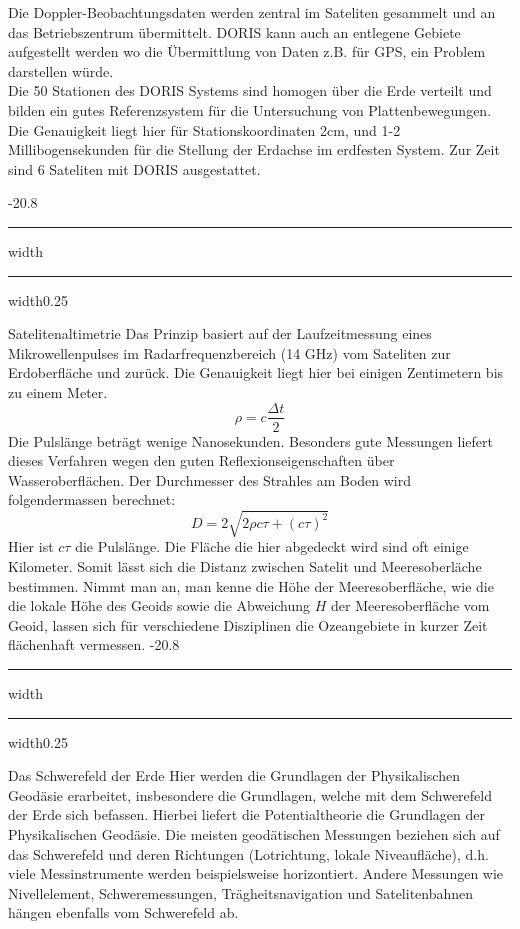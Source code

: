 \documentclass[9pt, landscape, fleqn]{scrartcl}
\makeatletter
\renewcommand{\section}{\@startsection{section}{1}{0mm}%
{-2\baselineskip}{0.8\baselineskip}%
{\hrule depth 0.2pt width\columnwidth\hrule depth1.5pt
width0.25\columnwidth\vspace*{1.2em}\Large\bfseries\rmfamily}}
\renewcommand{\subsection}{\@startsection{subsection}{1}{0mm}%
{-2\baselineskip}{0.8\baselineskip}%
{\hrule depth 0.2pt width\columnwidth\hrule depth0.75pt
width0.25\columnwidth\vspace*{1.2em}\large\bfseries\rmfamily}}
\makeatother
\begin{document}
\begin{multicols*}{3}
Die Doppler-Beobachtungsdaten werden zentral im Sateliten gesammelt und an das Betriebszentrum übermittelt. DORIS kann auch an entlegene Gebiete aufgestellt werden wo die Übermittlung von Daten z.B. für GPS, ein Problem darstellen würde. \\

Die 50 Stationen des DORIS Systems sind homogen über die Erde verteilt und bilden ein gutes Referenzsystem für die Untersuchung von Plattenbewegungen. Die Genauigkeit liegt hier für Stationskoordinaten 2cm, und 1-2 Millibogensekunden für die Stellung der Erdachse im erdfesten System. Zur Zeit sind 6 Sateliten mit DORIS ausgestattet.

\subsection{Satelitenaltimetrie}
Das Prinzip basiert auf der Laufzeitmessung eines Mikrowellenpulses im Radarfrequenzbereich (14 GHz) vom Sateliten zur Erdoberfläche und zurück. Die Genauigkeit liegt hier bei einigen Zentimetern bis zu einem Meter. 
\begin{equation*}
    \rho = c \frac{\Delta t}{2}
\end{equation*}
Die Pulslänge beträgt wenige Nanosekunden. Besonders gute Messungen liefert dieses Verfahren wegen den guten Reflexionseigenschaften über Wasseroberflächen. Der Durchmesser des Strahles am Boden wird folgendermassen berechnet:
\begin{equation*}
    D = 2 \sqrt{2 \rho c \tau + (c\tau)^2}
\end{equation*}
Hier ist $c\tau$ die Pulslänge. Die Fläche die hier abgedeckt wird sind oft einige Kilometer. Somit lässt sich die Distanz zwischen Satelit und Meeresoberläche bestimmen. Nimmt man an, man kenne die Höhe der Meeresoberfläche, wie die die lokale Höhe des Geoids sowie die Abweichung $H$ der Meeresoberfläche vom Geoid, lassen sich für verschiedene Disziplinen die Ozeangebiete in kurzer Zeit flächenhaft vermessen.
\section{Das Schwerefeld der Erde}
Hier werden die Grundlagen der Physikalischen Geodäsie erarbeitet, insbesondere die Grundlagen, welche mit dem Schwerefeld der Erde sich befassen. Hierbei liefert die Potentialtheorie die Grundlagen der Physikalischen Geodäsie. Die meisten geodätischen Messungen beziehen sich auf das Schwerefeld und deren Richtungen (Lotrichtung, lokale Niveaufläche), d.h. viele Messinstrumente werden beispielsweise horizontiert. Andere Messungen wie Nivellelement, Schweremessungen, Trägheitsnavigation und Satelitenbahnen hängen ebenfalls vom Schwerefeld ab.

\end{multicols*}
\end{document}
